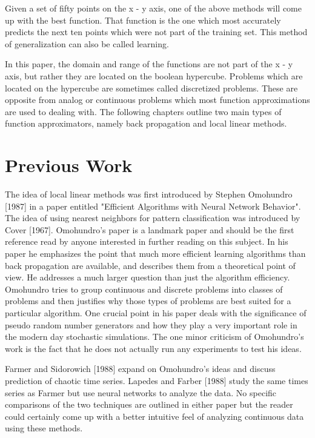 	Given a set of fifty points on the x - y axis, one of the
above methods will come up with the best function.  That function is
the one which most accurately predicts the next ten points which were
not part of the training set.  This method of generalization can also
be called learning.

	In this paper, the domain and range of the functions are not
part of the x - y axis, but rather they are located on the boolean
hypercube.  Problems which are located on the hypercube are sometimes
called discretized problems.  These are opposite from analog or
continuous problems which most function approximations are used to
dealing with.  The following chapters outline two main types of
function approximators, namely back propagation and local linear
methods.

\section{Previous Work}

	The idea of local linear methods was first introduced by
Stephen Omohundro [1987] in a paper entitled "Efficient Algorithms
with Neural Network Behavior".  The idea of using nearest neighbors
for pattern classification was introduced by Cover [1967].
Omohundro's paper is a landmark paper and should be the first
reference read by anyone interested in further reading on this
subject.  In his paper he emphasizes the point that much more
efficient learning algorithms than back propagation are available, and
describes them from a theoretical point of view. He addresses a much
larger question than just the algorithm efficiency.  Omohundro tries to
group continuous and discrete problems into classes of problems and
then justifies why those types of problems are best suited for a
particular algorithm.  One crucial point in his paper deals with the
significance of pseudo random number generators and how they play a
very important role in the modern day stochastic simulations.  The one
minor criticism of Omohundro's work is the fact that he does not
actually run any experiments to test his ideas.

	Farmer and Sidorowich [1988] expand on Omohundro's ideas and
discuss prediction of chaotic time series.  Lapedes and Farber [1988]
study the same times series as Farmer but use neural networks to
analyze the data.  No specific comparisons of the two techniques are
outlined in either paper but the reader could certainly come up with a
better intuitive feel of analyzing continuous data using these
methods.

